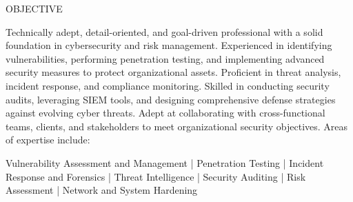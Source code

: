 \documentclass{resume} %
\begin{document}
\begin{rSection}{OBJECTIVE}

Technically adept, detail-oriented, and goal-driven professional with a solid foundation in cybersecurity and risk management. Experienced in identifying vulnerabilities, performing penetration testing, and implementing advanced security measures to protect organizational assets. Proficient in threat analysis, incident response, and compliance monitoring. Skilled in conducting security audits, leveraging SIEM tools, and designing comprehensive defense strategies against evolving cyber threats. Adept at collaborating with cross-functional teams, clients, and stakeholders to meet organizational security objectives. Areas of expertise include:

\vspace{3mm}
\begin{center}
    Vulnerability Assessment and Management | Penetration Testing | Incident Response and Forensics | Threat Intelligence | Security Auditing | Risk Assessment | Network and System Hardening
\end{center}

\end{rSection}
\end{document}
